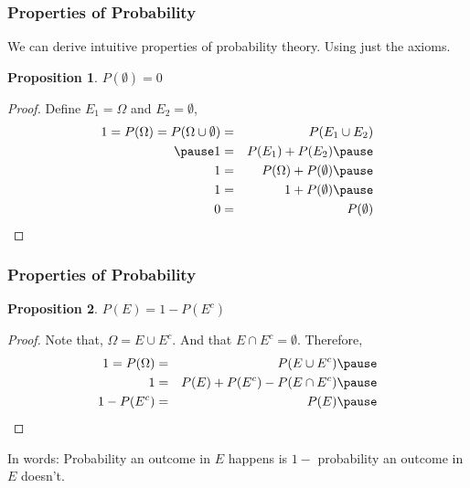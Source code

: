 \documentclass[handout]{beamer}
\newtheorem{prop}{Proposition}
\numberwithin{equation}{section}
\begin{document}
\begin{frame}
\frametitle{Properties of Probability} 

We can derive intuitive properties of probability theory. Using just the axioms.
\pause 

\begin{prop} 
$P(\emptyset) = 0 $ 
\end{prop}  \pause 

\begin{proof}\pause 
Define $E_{1} = \Omega$ and $E_{2} = \emptyset$,  \pause 
\begin{eqnarray}
1 = P(\Omega) = P(\Omega \cup \emptyset)  & = & P(E_1 \cup
  E_{2}) \nonumber \\\pause 
1& = & P(E_{1})  + P(E_{2} ) \nonumber \pause \\
1& = & P(\Omega) + P(\emptyset) \nonumber  \pause \\
1& = & 1 + P(\emptyset) \nonumber \pause \\
0 & = & P(\emptyset) \nonumber 
\end{eqnarray}

\end{proof}

\end{frame}


\begin{frame}
\frametitle{Properties of Probability} 

\pause 

\begin{prop} 
$P(E) = 1 - P(E^{c})  $
\end{prop} \pause 

\begin{proof}  \pause 
Note that, $\Omega = E \cup E^{c}$.  And that $E \cap E^{c}
  = \emptyset$.\pause 
Therefore,  \pause 
\begin{eqnarray}
1 = P(\Omega) & = & P(E \cup E^{c} ) \nonumber \pause \\
1& = & P(E) + P(E^{c} ) - P(E \cap E^c) \nonumber \pause \\
1 - P(E^{c} ) & = & P(E) \nonumber  \pause 
\end{eqnarray}

\end{proof}  \pause 

In words: Probability an outcome in $E$ happens is $1 - $ probability
an outcome in $E$ 
doesn't.  


\end{frame}
\end{document}
